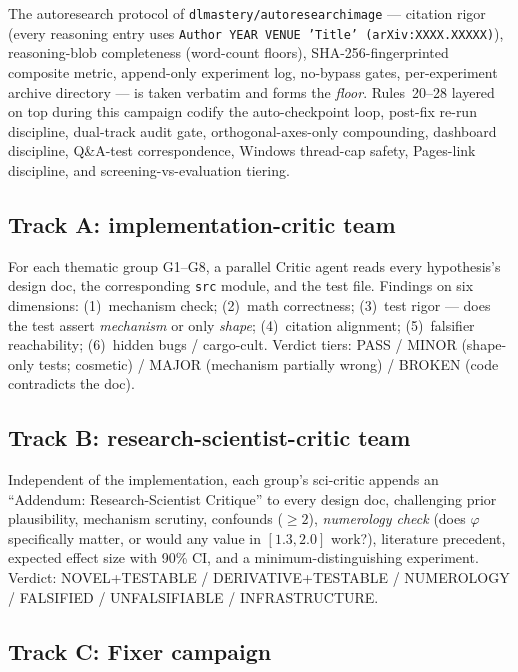 \documentclass{article}
\begin{document}
The autoresearch protocol of \texttt{dlmastery/autoresearchimage} ---
citation rigor (every reasoning entry uses
\texttt{Author YEAR VENUE 'Title' (arXiv:XXXX.XXXXX)}), reasoning-blob
completeness (word-count floors), SHA-256-fingerprinted composite
metric, append-only experiment log, no-bypass gates, per-experiment
archive directory --- is taken verbatim and forms the \emph{floor}.
Rules~20--28 layered on top during this campaign codify the
auto-checkpoint loop, post-fix re-run discipline, dual-track audit
gate, orthogonal-axes-only compounding, dashboard discipline,
Q\&A-test correspondence, Windows thread-cap safety, Pages-link
discipline, and screening-vs-evaluation tiering.

\subsection{Track A: implementation-critic team}
\label{sec:track-a}

For each thematic group G1--G8, a parallel Critic agent reads every
hypothesis's design doc, the corresponding \texttt{src} module, and
the test file. Findings on six dimensions: (1)~mechanism check;
(2)~math correctness; (3)~test rigor --- does the test assert
\emph{mechanism} or only \emph{shape}; (4)~citation alignment;
(5)~falsifier reachability; (6)~hidden bugs / cargo-cult. Verdict
tiers: PASS / MINOR (shape-only tests; cosmetic) / MAJOR (mechanism
partially wrong) / BROKEN (code contradicts the doc).

\subsection{Track B: research-scientist-critic team}
\label{sec:track-b}

Independent of the implementation, each group's sci-critic appends an
``Addendum: Research-Scientist Critique'' to every design doc,
challenging prior plausibility, mechanism scrutiny, confounds
($\geq 2$), \emph{numerology check} (does $\varphi$ specifically
matter, or would any value in $[1.3, 2.0]$ work?), literature
precedent, expected effect size with 90\% CI, and a
minimum-distinguishing experiment. Verdict: NOVEL+TESTABLE /
DERIVATIVE+TESTABLE / NUMEROLOGY / FALSIFIED / UNFALSIFIABLE /
INFRASTRUCTURE.

\subsection{Track C: Fixer campaign}
\label{sec:fixer}
\end{document}
